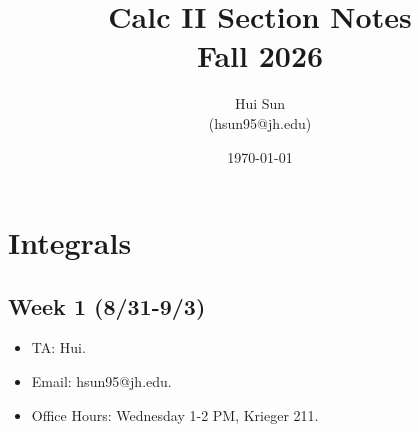 \documentclass[openany]{book}
\title{Calc II Section Notes
\\ 
\vspace{0.4cm}
\large Fall 2026}
\date{\today}
\author{Hui Sun\\
(hsun95@jh.edu)}
\begin{document}
\maketitle
\tableofcontents

\newpage

\chapter{Integrals}


\section*{\centering Week 1 (8/31-9/3)}



\begin{itemize}
    \item TA: Hui.
    \item Email: hsun95@jh.edu.
    \item Office Hours: Wednesday 1-2 PM, Krieger 211.
\end{itemize}





    
    
    
    
    
\end{document}
